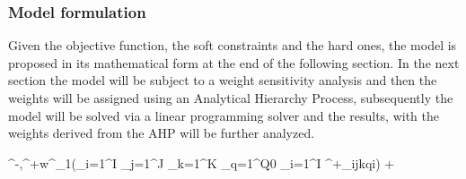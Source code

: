 \begin{doublespace}
\subsubsection{Model formulation}
Given the objective function, the soft constraints and the hard ones, the model is proposed in its mathematical form at the end of the following section. In the next section the model will be subject to a weight sensitivity analysis and then the weights will be assigned using an Analytical Hierarchy Process, subsequently the model will be solved via a linear programming solver and the results, with the weights derived from the AHP will be further analyzed.

\begin{mini!}
	{\delta^-,\delta^+}{w^\star_1(\sum_{i=1}^{I} \sum_{j=1}^{J} \sum_{k=1}^{K} \sum_{q=1}^{Q0} \sum_{i=1}^{I} \delta^+_{ijkqi}) + }{}{}
\end{mini!}


\end{doublespace}
